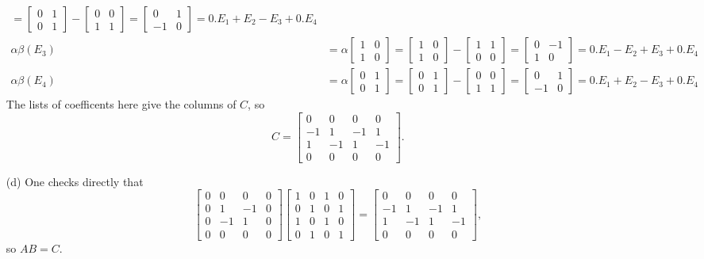 \documentclass{amsart}
\newcommand{\bsm}       {\left[\begin{smallmatrix}}
\newcommand{\esm}       {\end{smallmatrix}\right]}
\newcommand{\al}        {\alpha}
\newcommand{\bt}        {\beta}
\renewcommand{\:}       {\colon}
\theoremstyle{definition}
\renewenvironment{solution}{\SolutionAtEnd}{\endSolutionAtEnd}
\begin{document}
\begin{solution}
\begin{itemize}
\begin{align*}
                 =\bsm 0&1\\0&1\esm -\bsm 0&0\\1&1\esm
                 =\bsm 0&1\\-1&0\esm = 0.E_1+E_2 - E_3+0.E_4 \\
    \al\bt(E_3) &=\al\bsm 1&0\\1&0\esm 
                 =\bsm 1&0\\1&0\esm -\bsm 1&1\\0&0\esm
                 =\bsm 0&-1\\1&0\esm = 0.E_1-E_2 + E_3+0.E_4 \\
    \al\bt(E_4) &=\al\bsm 0&1\\0&1\esm 
                 =\bsm 0&1\\0&1\esm -\bsm 0&0\\1&1\esm
                 =\bsm 0&1\\-1&0\esm = 0.E_1+E_2 - E_3+0.E_4
   \end{align*}
   The lists of coefficents here give the columns of $C$,
   so
   {\tiny \[
     C = \bsm 0&0&0&0 \\ -1&1&-1&1 \\ 1&-1&1&-1\\ 0&0&0&0 \esm.
   \]}
  \item[(d)] One checks directly that
   {\tiny \[
     \bsm 0&0&0&0 \\ 0&1&-1&0 \\ 0&-1&1&0\\ 0&0&0&0 \esm
     \bsm 1&0&1&0 \\ 0&1&0&1 \\ 1&0&1&0\\ 0&1&0&1 \esm = 
     \bsm 0&0&0&0 \\ -1&1&-1&1 \\ 1&-1&1&-1\\ 0&0&0&0 \esm,
   \]}
   so $AB=C$.
 \end{itemize}
\end{solution}
\end{document}
